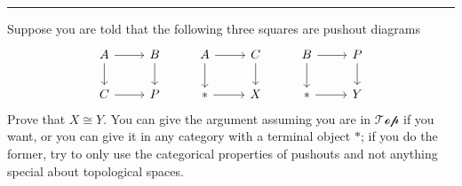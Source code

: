\documentclass[a4paper, 12pt]{article}
\begin{document}
\noindent\rule{7in}{2.8pt}
\begin{problem}{4}
Suppose you are told that the following three squares are pushout diagrams 
\[\begin{tikzcd}
	A & B & A & C & B & P \\
	C & P & {*} & X & {*} & Y
	\arrow[from=1-1, to=1-2]
	\arrow[from=1-1, to=2-1]
	\arrow[from=1-2, to=2-2]
	\arrow[from=1-3, to=1-4]
	\arrow[from=1-3, to=2-3]
	\arrow[from=1-4, to=2-4]
	\arrow[from=1-5, to=1-6]
	\arrow[from=1-5, to=2-5]
	\arrow[from=1-6, to=2-6]
	\arrow[from=2-1, to=2-2]
	\arrow[from=2-3, to=2-4]
	\arrow[from=2-5, to=2-6]
\end{tikzcd}\]
Prove that \(X\cong Y\). You can give the argument assuming you are in \(\mathcal{Top}\) if you want, or you can give it in any category with a terminal object \(*\); if you do the former, try to only use the categorical properties 
of pushouts and not anything special about topological spaces.
\end{problem}
\end{document}
